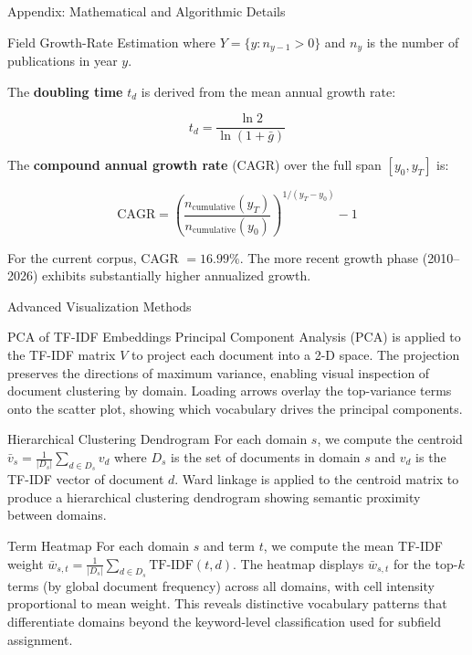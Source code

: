 \documentclass[
  ignorenonframetext,
]{beamer}
\begin{document}
\begin{frame}[fragile]{Appendix: Mathematical and Algorithmic Details
\label{sec:technical_appendix}}
\begin{block}{Field Growth-Rate Estimation \label{sec:appendix_growth}}
where \(Y = \{y : n_{y-1} > 0\}\) and \(n_y\) is the number of
publications in year \(y\).

The \textbf{doubling time} \(t_d\) is derived from the mean annual
growth rate:

\begin{equation}
t_d = \frac{\ln 2}{\ln(1 + \bar{g})} \label{eq:doubling_time}
\end{equation}

The \textbf{compound annual growth rate} (CAGR) over the full span
\([y_0, y_T]\) is:

\begin{equation}
\text{CAGR} = \left(\frac{n_{\text{cumulative}}(y_T)}{n_{\text{cumulative}}(y_0)}\right)^{1/(y_T - y_0)} - 1 \label{eq:cagr}
\end{equation}

For the current corpus, CAGR \(= 16.99\%\). The more recent growth phase
(2010--2026) exhibits substantially higher annualized growth.
\end{block}

\begin{block}{Advanced Visualization Methods \label{sec:appendix_viz}}
\protect{}\label{advanced-visualization-methods}
\begin{block}{PCA of TF-IDF Embeddings}
\protect{}\label{pca-of-tf-idf-embeddings}
Principal Component Analysis (PCA) is applied to the TF-IDF matrix \(V\)
to project each document into a 2-D space. The projection preserves the
directions of maximum variance, enabling visual inspection of document
clustering by domain. Loading arrows overlay the top-variance terms onto
the scatter plot, showing which vocabulary drives the principal
components.
\end{block}

\begin{block}{Hierarchical Clustering Dendrogram}
\protect{}\label{hierarchical-clustering-dendrogram}
For each domain \(s\), we compute the centroid
\(\bar{v}_s = \frac{1}{|D_s|} \sum_{d \in D_s} v_d\) where \(D_s\) is
the set of documents in domain \(s\) and \(v_d\) is the TF-IDF vector of
document \(d\). Ward linkage is applied to the centroid matrix to
produce a hierarchical clustering dendrogram showing semantic proximity
between domains.
\end{block}

\begin{block}{Term Heatmap}
\protect{}\label{term-heatmap}
For each domain \(s\) and term \(t\), we compute the mean TF-IDF weight
\(\bar{w}_{s,t} = \frac{1}{|D_s|} \sum_{d \in D_s} \text{TF-IDF}(t, d)\).
The heatmap displays \(\bar{w}_{s,t}\) for the top-\(k\) terms (by
global document frequency) across all domains, with cell intensity
proportional to mean weight. This reveals distinctive vocabulary
patterns that differentiate domains beyond the keyword-level
classification used for subfield assignment.
\end{block}


\end{block}
\end{frame}
\end{document}
